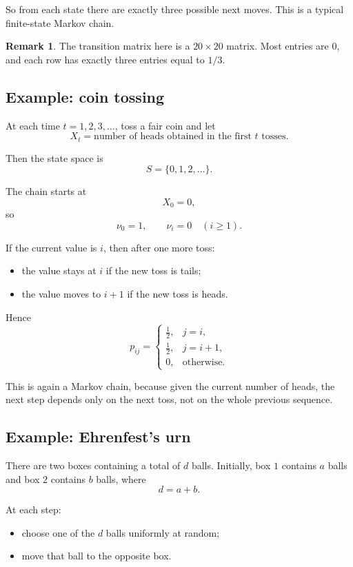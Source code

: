 \documentclass[11pt]{article}
\theoremstyle{definition}
\newtheorem{remark}[theorem]{Remark}
\begin{document}
So from each state there are exactly three possible next moves. This is a typical finite-state Markov chain.

\begin{remark}
The transition matrix here is a \(20\times 20\) matrix. Most entries are \(0\), and each row has exactly three entries equal to \(1/3\).
\end{remark}

\subsection{Example: coin tossing}

At each time \(t=1,2,3,\dots\), toss a fair coin and let
\[
X_t=\text{number of heads obtained in the first \(t\) tosses}.
\]

Then the state space is
\[
S=\{0,1,2,\dots\}.
\]

The chain starts at
\[
X_0=0,
\]
so
\[
\nu_0=1,
\qquad
\nu_i=0 \quad (i\ge 1).
\]

If the current value is \(i\), then after one more toss:
\begin{itemize}[leftmargin=2em]
    \item the value stays at \(i\) if the new toss is tails;
    \item the value moves to \(i+1\) if the new toss is heads.
\end{itemize}

Hence
\[
p_{ij}=
\begin{cases}
\frac12, & j=i,\\[0.4em]
\frac12, & j=i+1,\\[0.4em]
0, & \text{otherwise.}
\end{cases}
\]

This is again a Markov chain, because given the current number of heads, the next step depends only on the next toss, not on the whole previous sequence.

\subsection{Example: Ehrenfest's urn}

There are two boxes containing a total of \(d\) balls. Initially, box \(1\) contains \(a\) balls and box \(2\) contains \(b\) balls, where
\[
d=a+b.
\]

At each step:
\begin{itemize}[leftmargin=2em]
    \item choose one of the \(d\) balls uniformly at random;
    \item move that ball to the opposite box.
\end{itemize}
\end{document}
